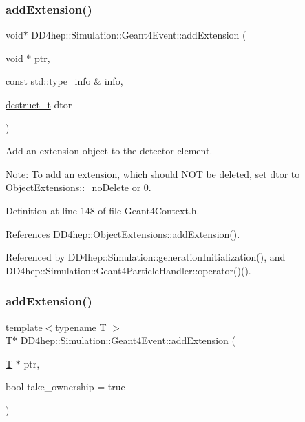 \subsubsection{\texorpdfstring{add\+Extension()}{addExtension()}\hspace{0.1cm}{\footnotesize\ttfamily [1/2]}}
{\footnotesize\ttfamily void$\ast$ D\+D4hep\+::\+Simulation\+::\+Geant4\+Event\+::add\+Extension (\begin{DoxyParamCaption}\item[{void $\ast$}]{ptr,  }\item[{const std\+::type\+\_\+info \&}]{info,  }\item[{\hyperlink{class_d_d4hep_1_1_object_extensions_a705a3524f9097577069a83993a39a9b2}{destruct\+\_\+t}}]{dtor }\end{DoxyParamCaption})\hspace{0.3cm}{\ttfamily [inline]}}



Add an extension object to the detector element. 

Note\+: To add an extension, which should N\+OT be deleted, set \textquotesingle{}dtor\textquotesingle{} to \hyperlink{class_d_d4hep_1_1_object_extensions_a0c32fb2af89407102b494ab9c15f9eac}{Object\+Extensions\+::\+\_\+no\+Delete} or 0. 

Definition at line 148 of file Geant4\+Context.\+h.



References D\+D4hep\+::\+Object\+Extensions\+::add\+Extension().



Referenced by D\+D4hep\+::\+Simulation\+::generation\+Initialization(), and D\+D4hep\+::\+Simulation\+::\+Geant4\+Particle\+Handler\+::operator()().

\hypertarget{class_d_d4hep_1_1_simulation_1_1_geant4_event_ab36b9e314cbcaa56851c712ba7d0db51}{}\label{class_d_d4hep_1_1_simulation_1_1_geant4_event_ab36b9e314cbcaa56851c712ba7d0db51} 
\subsubsection{\texorpdfstring{add\+Extension()}{addExtension()}\hspace{0.1cm}{\footnotesize\ttfamily [2/2]}}
{\footnotesize\ttfamily template$<$typename T $>$ \\
\hyperlink{class_t}{T}$\ast$ D\+D4hep\+::\+Simulation\+::\+Geant4\+Event\+::add\+Extension (\begin{DoxyParamCaption}\item[{\hyperlink{class_t}{T} $\ast$}]{ptr,  }\item[{bool}]{take\+\_\+ownership = {\ttfamily true} }\end{DoxyParamCaption})\hspace{0.3cm}{\ttfamily [inline]}}



